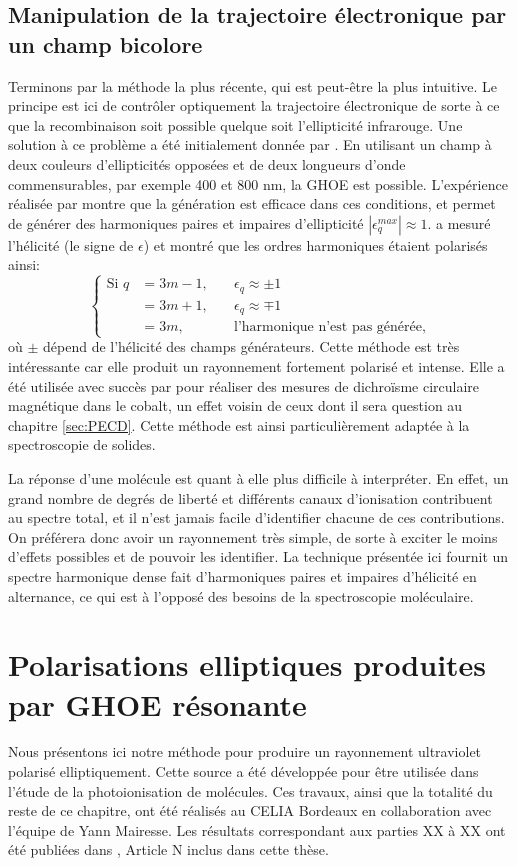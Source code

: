 \subsection{Manipulation de la trajectoire électronique par un champ bicolore}
Terminons par la méthode la plus récente, qui est peut-être la plus intuitive. Le principe est ici de contrôler optiquement la trajectoire électronique de sorte à ce que la recombinaison soit possible quelque soit l'ellipticité infrarouge. Une solution à ce problème a été initialement donnée par . En utilisant un champ à deux couleurs d’ellipticités opposées et de deux longueurs d'onde commensurables, par exemple 400 et 800 nm, la GHOE est possible. L'expérience réalisée par  montre que la génération est efficace dans ces conditions, et permet de générer des harmoniques paires et impaires d'ellipticité $|\epsilon^{max}_q|\approx 1$.  a mesuré l'hélicité (le signe de $\epsilon$) et montré que les ordres harmoniques étaient polarisés ainsi:
\[\left\{
\begin{aligned}
  \text{Si }q&=3m-1,\quad &\epsilon_q \approx \pm 1 \\
	&=3m+1, &\epsilon_q \approx \mp 1 \\
	&=3m, &\text{l'harmonique n'est pas générée},
\end{aligned}
\right.\]
où $\pm$ dépend de l'hélicité des champs générateurs. Cette méthode est très intéressante car elle produit un rayonnement fortement polarisé et intense. Elle a été utilisée avec succès par  pour réaliser des mesures de dichroïsme circulaire magnétique dans le cobalt, un effet voisin de ceux dont il sera question au chapitre \ref{sec:PECD}. Cette méthode est ainsi particulièrement adaptée à la spectroscopie de solides.\par
La réponse d'une molécule est quant à elle plus difficile à interpréter. En effet, un grand nombre de degrés de liberté et différents canaux d'ionisation contribuent au spectre total, et il n'est jamais facile d'identifier chacune de ces contributions. 
On préférera donc avoir un rayonnement très simple, de sorte à exciter le moins d'effets possibles et de pouvoir les identifier. La technique présentée ici fournit un spectre harmonique dense fait d'harmoniques paires et impaires d'hélicité en alternance, ce qui est à l'opposé des besoins de la spectroscopie moléculaire.

\section{Polarisations elliptiques produites par GHOE résonante}
Nous présentons ici notre méthode pour produire un rayonnement ultraviolet polarisé elliptiquement. Cette source a été développée pour être utilisée dans l'étude de la photoionisation de molécules. Ces travaux, ainsi que la totalité du reste de ce chapitre, ont été réalisés au CELIA Bordeaux en collaboration avec l'équipe de Yann Mairesse. Les résultats correspondant aux parties XX à XX ont été publiées dans , Article N inclus dans cette thèse.

